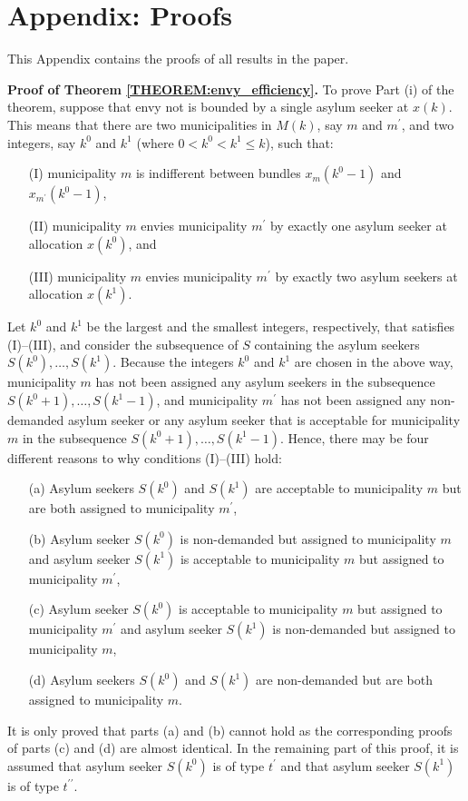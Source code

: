 \documentclass[12pt,fleqn]{article}
\begin{document}
\section*{Appendix: Proofs}
This Appendix contains the proofs of all results in the paper.

\medskip

\noindent\textbf{Proof of Theorem \ref{THEOREM:envy_efficiency}.} To prove Part (i) of the theorem, suppose that envy not is bounded by a single asylum seeker at $x(k)$. This means that there are two municipalities in $M(k)$, say $m$ and $m^\prime$, and two integers, say $k^0$ and $k^1$ (where $0<k^0<k^1\leq k$), such that:
\begin{itemize}
\item[(I)] municipality $m$ is indifferent between bundles $x_{m}(k^0-1)$ and $x_{m^\prime}(k^0-1)$,
\item[(II)] municipality $m$ envies municipality $m^\prime$ by exactly one asylum seeker at allocation $x(k^0)$, and
\item[(III)] municipality $m$ envies municipality $m^\prime$ by exactly two asylum seekers at allocation $x(k^1)$.
\end{itemize}
\noindent Let $k^0$ and $k^1$ be the largest and the smallest integers, respectively, that satisfies (I)--(III), and consider the subsequence of $S$ containing the asylum seekers $S(k^0),\ldots,S(k^1)$. Because the integers $k^0$ and $k^1$ are chosen in the above way, municipality $m$ has not been assigned any asylum seekers in the subsequence $S(k^0+1),\ldots,S(k^1-1)$, and municipality $m^\prime$ has not been assigned any non-demanded asylum seeker or any asylum seeker that is acceptable for municipality $m$ in the subsequence $S(k^0+1),\ldots,S(k^1-1)$. Hence, there may be four different reasons to why conditions (I)--(III) hold:
\begin{itemize}
\item[(a)] Asylum seekers $S(k^0)$ and $S(k^1)$ are acceptable to municipality $m$ but are both assigned to municipality $m^\prime$,
\item[(b)] Asylum seeker $S(k^0)$ is non-demanded but assigned to municipality $m$ and asylum seeker $S(k^1)$ is acceptable to municipality $m$ but assigned to municipality $m^\prime$,
\item[(c)] Asylum seeker $S(k^0)$ is acceptable to municipality $m$ but assigned to municipality $m^\prime$ and asylum seeker $S(k^1)$ is non-demanded but assigned to municipality $m$,
\item[(d)] Asylum seekers $S(k^0)$ and $S(k^1)$ are non-demanded but are both assigned to municipality $m$.
\end{itemize}
\noindent It is only proved that parts (a) and (b) cannot hold as the corresponding proofs of parts (c) and (d) are almost identical. In the remaining part of this proof, it is assumed that asylum seeker $S(k^0)$ is of type $t^\prime$ and that asylum seeker $S(k^1)$ is of type $t^{\prime\prime}$.
\end{document}
